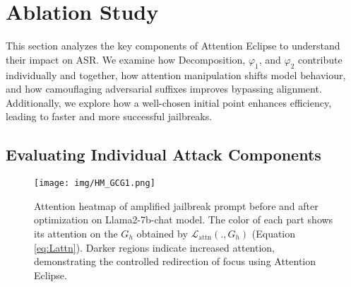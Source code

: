\section{Ablation Study}

This section analyzes the key components of Attention Eclipse to understand their impact on ASR. We examine how Decomposition, $\varphi_1$, and $\varphi_2$ contribute individually and together, how attention manipulation shifts model behaviour, and how camouflaging adversarial suffixes improves bypassing alignment. Additionally, we explore how a well-chosen initial point enhances efficiency, leading to faster and more successful jailbreaks.


\subsection{Evaluating Individual Attack Components}






\begin{figure*}[ht]
    \centering
    \texttt{[image: img/HM\_GCG1.png]}
    \caption{Attention heatmap of amplified jailbreak prompt before and after optimization on Llama2-7b-chat model. The color of each part shows its attention on the $G_h$ obtained by $\mathcal{L}_{\text{attn}}(., G_h)$ (Equation \ref{eq:Lattn}). Darker regions indicate increased attention, demonstrating the controlled redirection of focus using Attention Eclipse.}
    \label{fig: AutoDAN_heatmap}
\end{figure*}



